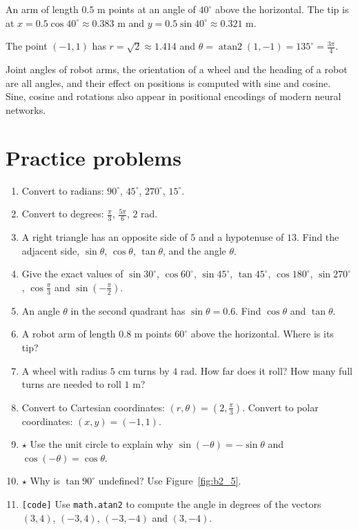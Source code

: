 \begin{example}
An arm of length $0.5$ m points at an angle of $40^\circ$ above the horizontal. The tip is at
$x=0.5\cos40^\circ\approx0.383$ m and $y=0.5\sin40^\circ\approx0.321$ m.
\end{example}

\begin{example}
The point $(-1,1)$ has $r=\sqrt2\approx1.414$ and $\theta=\operatorname{atan2}(1,-1)=135^\circ=\frac{3\pi}{4}$.
\end{example}

\begin{aibox}
Joint angles of robot arms, the orientation of a wheel and the heading of a robot are all angles, and their effect on positions is computed with sine and cosine. Sine, cosine and rotations also appear in positional encodings of modern neural networks.
\end{aibox}

\section*{Practice problems}
\begin{enumerate}[label=\textbf{\thechapter.\arabic*}]
  \item Convert to radians: $90^\circ$, $45^\circ$, $270^\circ$, $15^\circ$.
  \item Convert to degrees: $\frac\pi3$, $\frac{5\pi}{6}$, $2$ rad.
  \item A right triangle has an opposite side of $5$ and a hypotenuse of $13$. Find the adjacent side, $\sin\theta$, $\cos\theta$, $\tan\theta$, and the angle $\theta$.
  \item Give the exact values of $\sin30^\circ$, $\cos60^\circ$, $\sin45^\circ$, $\tan45^\circ$, $\cos180^\circ$, $\sin270^\circ$, $\cos\frac\pi3$ and $\sin\left(-\frac\pi2\right)$.
  \item An angle $\theta$ in the second quadrant has $\sin\theta=0.6$. Find $\cos\theta$ and $\tan\theta$.
  \item A robot arm of length $0.8$ m points $60^\circ$ above the horizontal. Where is its tip?
  \item A wheel with radius $5$ cm turns by $4$ rad. How far does it roll? How many full turns are needed to roll $1$ m?
  \item Convert to Cartesian coordinates: $(r,\theta)=(2,\frac\pi3)$. Convert to polar coordinates: $(x,y)=(-1,1)$.
  \item $\star$ Use the unit circle to explain why $\sin(-\theta)=-\sin\theta$ and $\cos(-\theta)=\cos\theta$.
  \item $\star$ Why is $\tan90^\circ$ undefined? Use Figure~\ref{fig:b2_5}.
  \item \texttt{[code]} Use \texttt{math.atan2} to compute the angle in degrees of the vectors $(3,4)$, $(-3,4)$, $(-3,-4)$ and $(3,-4)$.
\end{enumerate}

